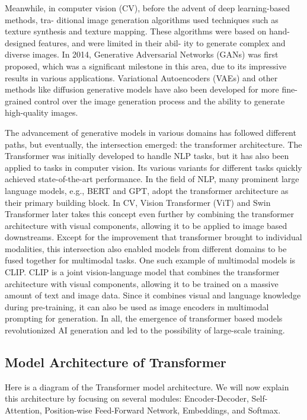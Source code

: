 \documentclass[conference]{IEEEtran}
\begin{document}
\par Meanwhile, in computer vision (CV), before the advent of deep learning-based methods, tra-
ditional image generation algorithms used techniques such as texture synthesis\cite{b14} and texture
mapping\cite{b15}. These algorithms were based on hand-designed features, and were limited in their abil-
ity to generate complex and diverse images. In 2014, Generative Adversarial Networks (GANs)\cite{goodfellow2020generative}
was first proposed, which was a significant milestone in this area, due to its impressive results
in various applications. Variational Autoencoders (VAEs)\cite{kingma2013auto} and other methods like diffusion
generative models\cite{song2019generative} have also been developed for more fine-grained control over the image
generation process and the ability to generate high-quality images.
\par The advancement of generative models in various domains has followed different paths, but
eventually, the intersection emerged: the transformer architecture\cite{b1}. The Transformer was 
initially developed to handle NLP tasks, but it has also been applied to tasks in computer vision. 
Its various variants for different tasks quickly achieved state-of-the-art performance. In the field of NLP, many
prominent large language models, e.g., BERT and GPT, adopt the transformer architecture as
their primary building block. In CV, Vision Transformer (ViT)\cite{dosovitskiy2020image} and Swin Transformer\cite{liu2021swin} 
later takes this concept even further by combining the transformer architecture with visual components, 
allowing it to be applied to image based downstreams. 
Except for the improvement that transformer brought
to individual modalities, this intersection also enabled models from different domains to be fused
together for multimodal tasks. One such example of multimodal models is CLIP\cite{radford2021learning}. CLIP is a
joint vision-language model that combines the transformer architecture with visual components,
allowing it to be trained on a massive amount of text and image data. Since it combines visual
and language knowledge during pre-training, it can also be used as image encoders in multimodal
prompting for generation. In all, the emergence of transformer based models revolutionized AI
generation and led to the possibility of large-scale training.

\subsection{Model Architecture of Transformer}
\par Here is a diagram of the Transformer model architecture. 
We will now explain this architecture by focusing on several modules: 
Encoder-Decoder\cite{bahdanau2014neural}, Self-Attention, Position-wise Feed-Forward Network, 
Embeddings, and Softmax.
\end{document}
